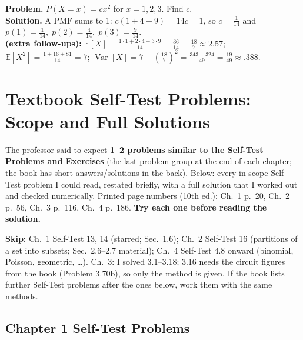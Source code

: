 \documentclass[11pt]{article}
\let\oldsubsection\subsection
\renewcommand{\subsection}{\Needspace{14\baselineskip}\oldsubsection}
\newcommand{\E}{\mathbb{E}}
\newcommand{\Var}{\operatorname{Var}}
\begin{document}
\begin{exbox}
\textbf{Problem.} $P(X=x)=cx^2$ for $x=1,2,3$. Find $c$.\\
\textbf{Solution.} A PMF sums to 1: $c(1+4+9)=14c=1$, so $c=\boxed{\tfrac1{14}}$ and $p(1)=\tfrac1{14},\;p(2)=\tfrac4{14},\;p(3)=\tfrac9{14}$.\\
\textbf{(extra follow-ups):} $\E[X]=\frac{1\cdot1+2\cdot4+3\cdot9}{14}=\frac{36}{14}=\frac{18}7\approx2.57$; $\E[X^2]=\frac{1+16+81}{14}=7$; $\Var[X]=7-\left(\tfrac{18}7\right)^2=\tfrac{343-324}{49}=\tfrac{19}{49}\approx.388$.
\end{exbox}

\clearpage
\section{Textbook Self-Test Problems: Scope and Full Solutions}\label{sec:selftest}

The professor said to expect \textbf{1--2 problems similar to the Self-Test Problems and Exercises} (the last problem group at the end of each chapter; the book has short answers/solutions in the back). Below: every in-scope Self-Test problem I could read, restated briefly, with a full solution that I worked out and checked numerically. Printed page numbers (10th ed.): Ch.~1 p.~20, Ch.~2 p.~56, Ch.~3 p.~116, Ch.~4 p.~186. \textbf{Try each one before reading the solution.}

\begin{warnbox}
\textbf{Skip:} Ch.~1 Self-Test 13, 14 (starred; Sec.~1.6); Ch.~2 Self-Test 16 (partitions of a set into subsets; Sec.~2.6--2.7 material); Ch.~4 Self-Test 4.8 onward (binomial, Poisson, geometric, \dots). Ch.~3: I solved 3.1--3.18; 3.16 needs the circuit figures from the book (Problem 3.70b), so only the method is given. If the book lists further Self-Test problems after the ones below, work them with the same methods.
\end{warnbox}

\subsection{Chapter 1 Self-Test Problems}
\end{document}
